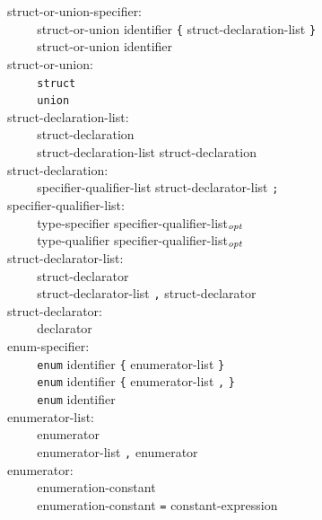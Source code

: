 \documentclass[12pt]{report}
\def\|{\verb|}
\newcommand\opt{$_{{\it opt}}$ }
\begin{document}
\noindent
struct-or-union-specifier:\\
\|    | struct-or-union identifier \verb+{+ struct-declaration-list \verb+}+\\
\|    | struct-or-union identifier\\

\noindent
struct-or-union:\\
\|    | \verb+struct+\\
\|    | \verb+union+\\

\noindent
struct-declaration-list:\\
\|    | struct-declaration\\
\|    | struct-declaration-list struct-declaration\\

\noindent
struct-declaration:\\
\|    | specifier-qualifier-list struct-declarator-list \verb+;+\\

\noindent
specifier-qualifier-list:\\
\|    | type-specifier specifier-qualifier-list\opt\\
\|    | type-qualifier specifier-qualifier-list\opt\\

\noindent
struct-declarator-list:\\
\|    | struct-declarator\\
\|    | struct-declarator-list \verb+,+ struct-declarator\\

\noindent
struct-declarator:\\
\|    | declarator\\

\noindent
enum-specifier:\\
\|    | \verb+enum+ identifier \verb+{+ enumerator-list \verb+}+\\
\|    | \verb+enum+ identifier \verb+{+ enumerator-list \verb+,+ \verb+}+\\
\|    | \verb+enum+ identifier\\

\noindent
enumerator-list:\\
\|    | enumerator\\
\|    | enumerator-list \verb+,+ enumerator\\

\noindent
enumerator:\\
\|    | enumeration-constant\\
\|    | enumeration-constant \verb+=+ constant-expression\\
\end{document}
